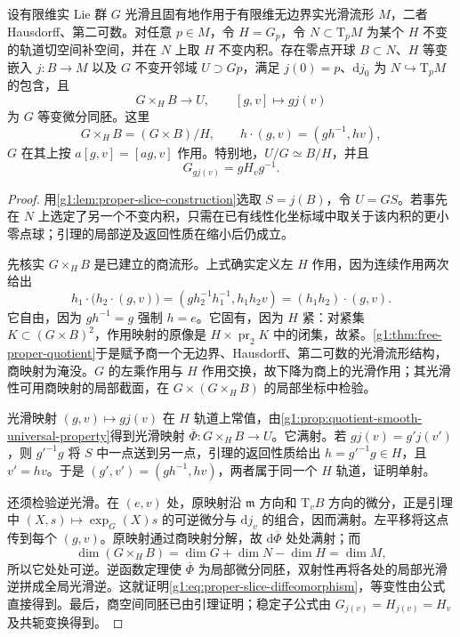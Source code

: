 \begin{theorem}[固有作用的切片定理]\label{g1:thm:proper-action-slice}
	设有限维实 Lie 群 \(G\) 光滑且固有地作用于有限维无边界实光滑流形 \(M\)，二者 Hausdorff、第二可数。对任意 \(p\in M\)，令 \(H=G_p\)，令 \(N\subset \mathrm{T}_pM\) 为某个 \(H\) 不变的轨道切空间补空间，并在 \(N\) 上取 \(H\) 不变内积。存在零点开球 \(B\subset N\)、\(H\) 等变嵌入 \(j:B\to M\) 以及 \(G\) 不变开邻域 \(U\supset Gp\)，满足 \(j(0)=p\)、\(\mathrm{d}j_0\) 为 \(N\hookrightarrow \mathrm{T}_pM\) 的包含，且
	\begin{equation}\label{g1:eq:proper-slice-diffeomorphism}
		G\times_H B\longrightarrow U,\qquad [g,v]\longmapsto g j(v)
	\end{equation}
	为 \(G\) 等变微分同胚。这里
	\[
		G\times_H B=(G\times B)/H,\qquad
		h\cdot(g,v)=(gh^{-1},hv),
	\]
	\(G\) 在其上按 \(a[g,v]=[ag,v]\) 作用。特别地，\(U/G\simeq B/H\)，并且
	\[
		G_{g j(v)}=gH_vg^{-1}.
	\]
\end{theorem}
\begin{proof}
	用\cref{g1:lem:proper-slice-construction}选取 \(S=j(B)\)，令 \(U=GS\)。若事先在 \(N\) 上选定了另一个不变内积，只需在已有线性化坐标域中取关于该内积的更小零点球；引理的局部逆及返回性质在缩小后仍成立。

	先核实 \(G\times_H B\) 是已建立的商流形。上式确实定义左 \(H\) 作用，因为连续作用两次给出
	\[
		h_1\cdot\bigl(h_2\cdot(g,v)\bigr)
		=(gh_2^{-1}h_1^{-1},h_1h_2v)
		=(h_1h_2)\cdot(g,v).
	\]
	它自由，因为 \(gh^{-1}=g\) 强制 \(h=e\)。它固有，因为 \(H\) 紧：对紧集 \(K\subset(G\times B)^2\)，作用映射的原像是 \(H\times\operatorname{pr}_2K\) 中的闭集，故紧。\cref{g1:thm:free-proper-quotient}于是赋予商一个无边界、Hausdorff、第二可数的光滑流形结构，商映射为淹没。\(G\) 的左乘作用与 \(H\) 作用交换，故下降为商上的光滑作用；其光滑性可用商映射的局部截面，在 \(G\times(G\times_HB)\) 的局部坐标中检验。

	光滑映射 \((g,v)\mapsto gj(v)\) 在 \(H\) 轨道上常值，由\cref{g1:prop:quotient-smooth-universal-property}得到光滑映射 \(\overline\Phi:G\times_HB\to U\)。它满射。若 \(g j(v)=g'j(v')\)，则 \(g'^{-1}g\) 将 \(S\) 中一点送到另一点，引理的返回性质给出 \(h=g'^{-1}g\in H\)，且 \(v'=hv\)。于是 \((g',v')=(gh^{-1},hv)\)，两者属于同一个 \(H\) 轨道，证明单射。

	还须检验逆光滑。在 \((e,v)\) 处，原映射沿 \(\mathfrak m\) 方向和 \(\mathrm{T}_vB\) 方向的微分，正是引理中 \((X,s)\mapsto\exp_G(X)s\) 的可逆微分与 \(\mathrm{d}j_v\) 的组合，因而满射。左平移将这点传到每个 \((g,v)\)。原映射通过商映射分解，故 \(\mathrm{d}\overline\Phi\) 处处满射；而
	\[
		\dim(G\times_HB)=\dim G+\dim N-\dim H=\dim M,
	\]
	所以它处处可逆。逆函数定理使 \(\overline\Phi\) 为局部微分同胚，双射性再将各处的局部光滑逆拼成全局光滑逆。这就证明\eqref{g1:eq:proper-slice-diffeomorphism}，等变性由公式直接得到。最后，商空间同胚已由引理证明；稳定子公式由 \(G_{j(v)}=H_{j(v)}=H_v\) 及共轭变换得到。
\end{proof}

